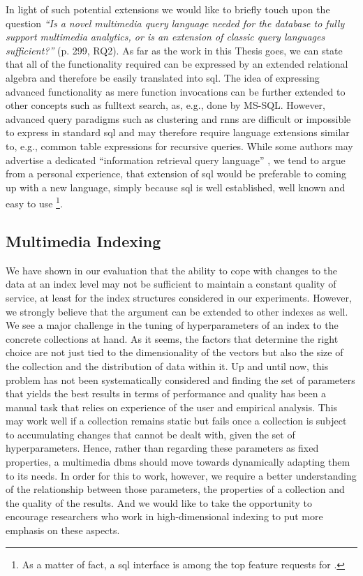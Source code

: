 In light of such potential extensions we would like to briefly touch upon the question  \emph{``Is a novel multimedia query language needed for the database to fully support multimedia analytics, or is an extension of classic query languages sufficient?''} \cite{Jonsson:2016Ten} (p. 299, RQ2). As far as the work in this Thesis goes, we can state that all of the functionality required can be expressed by an extended relational algebra and therefore be easily translated into \acrshort{sql}. The idea of expressing advanced functionality as mere function invocations can be further extended to other concepts such as fulltext search, as, e.g., done by MS-SQL. However, advanced query paradigms such as clustering and \acrshort{rnns} are difficult or impossible to express in standard \acrshort{sql} and may therefore require language extensions similar to, e.g., common table expressions for recursive queries. While some authors may advertise a dedicated ``information retrieval query language'' \cite{Ferro:2014Bridging}, we tend to argue from a personal experience, that extension of \acrshort{sql} would be preferable to coming up with a new language, simply because \acrshort{sql} is well established, well known and easy to use \footnote{As a matter of fact, a \acrshort{sql} interface is among the top feature requests for \cottontail{}.}.

\subsection{Multimedia Indexing}

We have shown in our evaluation that the ability to cope with changes to the data at an index level may not be sufficient to maintain a constant quality of service, at least for the index structures considered in our experiments. However, we strongly believe that the argument can be extended to other indexes as well. We see a major challenge in the tuning of hyperparameters of an index to the concrete collections at hand. As it seems, the factors that determine the right choice are not just tied to the dimensionality of the vectors but also the size of the collection and the distribution of data within it. Up and until now, this problem has not been systematically considered and finding the set of parameters that yields the best results in terms of performance and quality has been a manual task that relies on experience of the user and empirical analysis. This may work well if a collection remains static but fails once a collection is subject to accumulating changes that cannot be dealt with, given the set of hyperparameters. Hence, rather than regarding these parameters as fixed properties, a multimedia \acrshort{dbms} should move towards dynamically adapting them to its needs. In order for this to work, however, we require a better understanding of the relationship between those parameters, the properties of a collection and the quality of the results. And we would like to take the opportunity to encourage researchers who work in high-dimensional indexing to put more emphasis on these aspects.

